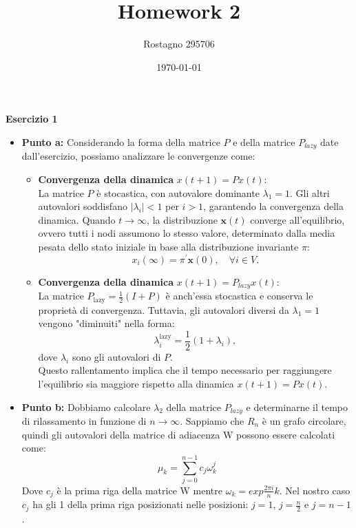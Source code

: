 \documentclass[a4paper,12pt]{article}
\begin{document}
	\title{\textbf{Homework 2}}
	\author{Rostagno 295706}
	\date{\today}
	\maketitle
	
	\centering \textbf{Esercizio 1}\\
	\begin{itemize}
		\item \textbf{Punto a: } 
		Considerando la forma della matrice $P$ e della matrice $P_{lazy}$ date dall'esercizio, possiamo analizzare le convergenze come:\\
		\begin{itemize}
			\item \textbf{Convergenza della dinamica} $x(t+1)=Px(t)$:\\
			La matrice \(P\) è stocastica, con autovalore dominante \(\lambda_1 = 1\). Gli altri autovalori soddisfano \(|\lambda_i| < 1\) per \(i > 1\), garantendo la convergenza della dinamica.
			Quando \(t \to \infty\), la distribuzione \(\mathbf{x}(t)\) converge all'equilibrio, ovvero tutti i nodi assumono lo stesso valore, determinato dalla media pesata dello stato iniziale in base alla distribuzione invariante \(\pi\):
			\[
			x_i(\infty) = \pi^\prime \mathbf{x}(0), \quad \forall i \in V.
			\]
			\item \textbf{Convergenza della dinamica} $x(t+1)=P_{lazy}x(t)$:\\
			La matrice \(P_{\text{lazy}} = \frac{1}{2}(I + P)\) è anch'essa stocastica e conserva le proprietà di convergenza. Tuttavia, gli autovalori diversi da \(\lambda_1 = 1\) vengono "diminuiti" nella forma:
			\[
			\lambda_i^{\text{lazy}} = \frac{1}{2}(1 + \lambda_i),
			\]
			dove \(\lambda_i\) sono gli autovalori di \(P\).\\
			Questo rallentamento implica che il tempo necessario per raggiungere l'equilibrio sia maggiore rispetto alla dinamica \(x(t + 1) = P x(t)\).	
		\end{itemize}
		\item \textbf{Punto b: }
		Dobbiamo calcolare $\lambda_2$ della matrice $P_{lazy}$ e determinarne il tempo di rilassamento in funzione di $n \rightarrow \infty$. Sappiamo che $R_n$ è un grafo circolare, quindi gli autovalori della matrice di adiacenza W possono essere calcolati come:\\
		\[
		\mu_k = \sum_{j=0}^{n-1} c_j \omega_k^j 
		\]
		Dove $c_j$ è la prima riga della matrice W mentre $\omega_k = exp{\frac{2 \pi i }{n}k}$. Nel nostro caso $c_j$ ha gli 1 della prima riga posizionati nelle posizioni: $j=1$, $j=\frac{n}{2}$ e $j=n-1$.\\

\end{itemize}
\end{document}

